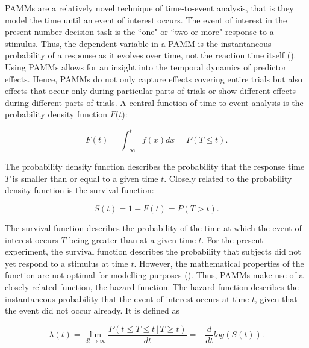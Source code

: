 PAMMs are a relatively novel technique of time-to-event analysis, that is they model the time until an event of interest occurs. The event of interest in the present number-decision task is the ``one" or ``two or more" response to a stimulus. Thus, the dependent variable in a PAMM is the instantaneous probability of a response as it evolves over time, not the reaction time itself (\cite{Hendrix2020}). Using PAMMs allows for an insight into the temporal dynamics of predictor effects. Hence, PAMMs do not only capture effects covering entire trials but also effects that occur only during particular parts of trials or show different effects during different parts of trials. A central function of time-to-event analysis is the probability density function $F(t$):

\begin{equation}
\label{eq:Ft}
    F(t)=\int_{-\infty}^{t}f(x)dx=P(T\leq t).
\end{equation}

The probability density function describes the probability that the response time $T$ is smaller than or equal to a given time $t$. Closely related to the probability density function is the survival function:

\begin{equation}
\label{eq:St}
    S(t)=1-F(t)=P(T>t).
\end{equation}

The survival function describes the probability of the time at which the event of interest occurs $T$ being greater than at a given time $t$. For the present experiment, the survival function describes the probability that subjects did not yet respond to a stimulus at time $t$. However, the mathematical properties of the function are not optimal for modelling purposes (\cite{Hendrix2020}). Thus, PAMMs make use of a closely related function, the hazard function. The hazard function describes the instantaneous probability that the event of interest occurs at time $t$, given that the event did not occur already. It is defined as

\begin{equation}
\label{eq:lambdat}
\lambda(t)=\lim \limits_{dt \to \infty}\frac{P(t\leq T\leq t\, |\, T\geq t)}{dt}=-\frac{d}{dt}log(S(t)).
\end{equation}

